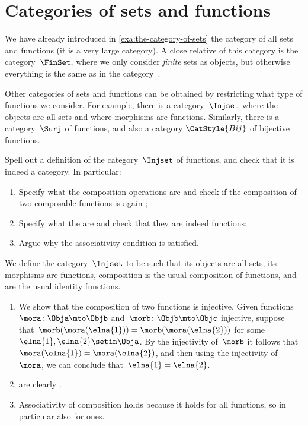 
\section{Categories of sets and functions}

We have already introduced in \cref{exa:the-category-of-sets} the category of all sets and functions (it is a very large category). A close relative of this category is the category~$\FinSet$, where we only consider \emph{finite} sets as objects, but otherwise everything is the same as in the category~\Set.

Other categories of sets and functions can be obtained by restricting what type of functions we consider.
For example, there is a category~$\Injset$ where the objects are all sets and where morphisms are  functions.
Similarly, there is a category~$\Surj$ of  functions, and also a category $\CatStyle{Bij}$ of bijective functions.

\begin{exercise}
    Spell out a definition of the category~$\Injset$ of  functions, and check that it is indeed a category.
    In particular:
    \begin{enumerate}
        \item Specify what the composition operations are and check if the composition of two composable  functions is again ;
        \item Specify what the   are and check that they are indeed  functions;
        \item Argue why the associativity condition is satisfied.
    \end{enumerate}
\end{exercise}

\begin{solution}
    We define the category~$\Injset$ to be such that its objects are all sets, its morphisms are  functions, composition is the usual composition of functions, and  are the usual identity functions.
    \begin{enumerate}
        \item We show that the composition of two  functions is injective.
              Given functions~$\mora \colon \Obja \mto \Objb$ and~$\morb \colon \Objb \mto \Objc$ injective, suppose that~$\morb(\mora (\elna{1})) = \morb(\mora (\elna{2}))$ for some~$\elna{1}, \elna{2} \setin \Obja$.
              By the injectivity of~$\morb$ it follows that~$\mora (\elna{1}) = \mora (\elna{2})$, and then using the injectivity of~$\mora$, we can conclude that~$\elna{1} = \elna{2}$.
        \item {} are clearly .
        \item Associativity of composition holds because it holds for all functions, so in particular also for  ones.
    \end{enumerate}
\end{solution}

